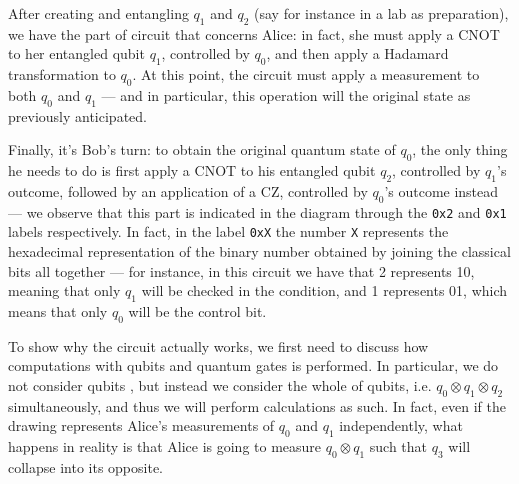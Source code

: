 \documentclass[a4paper, 12pt]{report}
\begin{document}
After creating and entangling $q_1$ and $q_2$ (say for instance in a lab as preparation), we have the part of circuit that concerns Alice: in fact, she must apply a CNOT to her entangled qubit $q_1$, controlled by $q_0$, and then apply a Hadamard transformation to $q_0$. At this point, the circuit must apply a measurement to both $q_0$ and $q_1$ --- and in particular, this operation will  the original state as previously anticipated.

Finally, it's Bob's turn: to obtain the original quantum state of $q_0$, the only thing he needs to do is first apply a CNOT to his entangled qubit $q_2$, controlled by $q_1$'s outcome, followed by an application of a CZ, controlled by $q_0$'s outcome instead --- we observe that this part is indicated in the diagram through the \texttt{0x2} and \texttt{0x1} labels respectively. In fact, in the label \texttt{0xX} the number \texttt X represents the hexadecimal representation of the binary number obtained by joining the classical bits all together --- for instance, in this circuit we have that 2 represents 10, meaning that only $q_1$ will be checked in the condition, and 1 represents 01, which means that only $q_0$ will be the control bit.

To show why the circuit actually works, we first need to discuss how computations with qubits and quantum gates is performed. In particular, we do not consider qubits , but instead we consider the whole  of qubits, i.e. $q_0 \otimes q_1 \otimes q_2$ simultaneously, and thus we will perform calculations as such. In fact, even if the drawing represents Alice's measurements of $q_0$ and $q_1$ independently, what happens in reality is that Alice is going to measure $q_0 \otimes q_1$ such that $q_3$ will collapse into its opposite.
\end{document}
